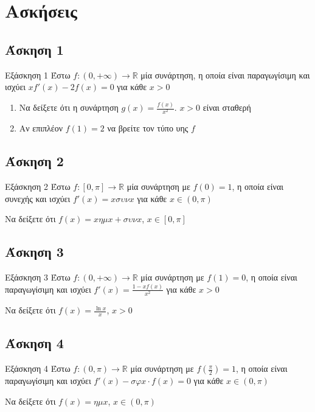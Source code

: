 \documentclass[greek]{beamer}
\begin{document}
\section{Ασκήσεις}
\subsection{Άσκηση 1}
\begin{frame}[label=Άσκηση1]{Εξάσκηση 1}
 Έστω $f:(0,+\infty)\to\mathbb{R}$ μία συνάρτηση, η οποία είναι παραγωγίσιμη και ισχύει $xf'(x)-2f(x)=0$ για κάθε $x>0$
 \begin{enumerate}
  \item<1-> Να δείξετε ότι η συνάρτηση $g(x)=\frac{f(x)}{x^2}$. $x>0$ είναι σταθερή
  \item<2-> Αν επιπλέον $f(1)=2$ να βρείτε τον τύπο υης $f$
 \end{enumerate}

\end{frame}

\subsection{Άσκηση 2}
\begin{frame}[label=Άσκηση2]{Εξάσκηση 2}
 Έστω $f:[0,π]\to\mathbb{R}$ μία συνάρτηση με $f(0)=1$, η οποία είναι συνεχής και ισχύει $f'(x)=xσυνx$ για κάθε $x\in (0,π)$

 Να δείξετε ότι $f(x)=xημx+συνx$, $x\in [0,π]$

\end{frame}

\subsection{Άσκηση 3}
\begin{frame}[label=Άσκηση3]{Εξάσκηση 3}
 Έστω $f:(0,+\infty)\to\mathbb{R}$ μία συνάρτηση με $f(1)=0$, η οποία είναι παραγωγίσιμη και ισχύει $f'(x)=\frac{1-xf(x)}{x^2}$ για κάθε $x>0$

 Να δείξετε ότι $f(x)=\frac{\ln x}{x}$, $x>0$

\end{frame}

\subsection{Άσκηση 4}
\begin{frame}[label=Άσκηση4]{Εξάσκηση 4}
 Έστω $f:(0,π)\to\mathbb{R}$ μία συνάρτηση με $f(\frac{π}{2})=1$, η οποία είναι παραγωγίσιμη και ισχύει $f'(x)-σφx\cdot f(x)=0$ για κάθε $x\in (0,π)$

 Να δείξετε ότι $f(x)=ημx$, $x\in (0,π)$

\end{frame}
\end{document}
